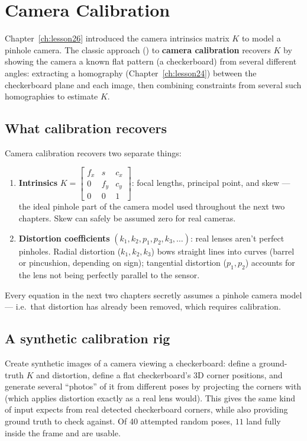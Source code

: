 \chapter{Camera Calibration}
\label{ch:lesson27}

Chapter~\ref{ch:lesson26} introduced the camera intrinsics matrix $K$ to model a pinhole camera. The classic approach () to \textbf{camera calibration} recovers $K$ by showing the camera a known flat pattern (a checkerboard) from several different angles: extracting a homography (Chapter~\ref{ch:lesson24}) between the checkerboard plane and each image, then combining constraints from several such homographies to estimate $K$.

\section{What calibration recovers}

Camera calibration recovers two separate things:
\begin{enumerate}
  \item \textbf{Intrinsics} $K=\begin{bmatrix}f_x&s&c_x\\0&f_y&c_y\\0&0&1\end{bmatrix}$: focal lengths, principal point, and skew --- the ideal pinhole part of the camera model used throughout the next two chapters. Skew can safely be assumed zero for real cameras.
  \item \textbf{Distortion coefficients} $(k_1,k_2,p_1,p_2,k_3,\ldots)$: real lenses aren't perfect pinholes. Radial distortion ($k_1,k_2,k_3$) bows straight lines into curves (barrel or pincushion, depending on sign); tangential distortion ($p_1,p_2$) accounts for the lens not being perfectly parallel to the sensor.
\end{enumerate}
Every equation in the next two chapters secretly assumes a pinhole camera model --- i.e.\ that distortion has already been removed, which requires calibration.

\section{A synthetic calibration rig}

Create synthetic images of a camera viewing a checkerboard: define a ground-truth $K$ and distortion, define a flat checkerboard's 3D corner positions, and generate several ``photos'' of it from different poses by projecting the corners with  (which applies distortion exactly as a real lens would). This gives the same kind of input  expects from real detected checkerboard corners, while also providing ground truth to check against. Of 40 attempted random poses, $11$ land fully inside the frame and are usable.

